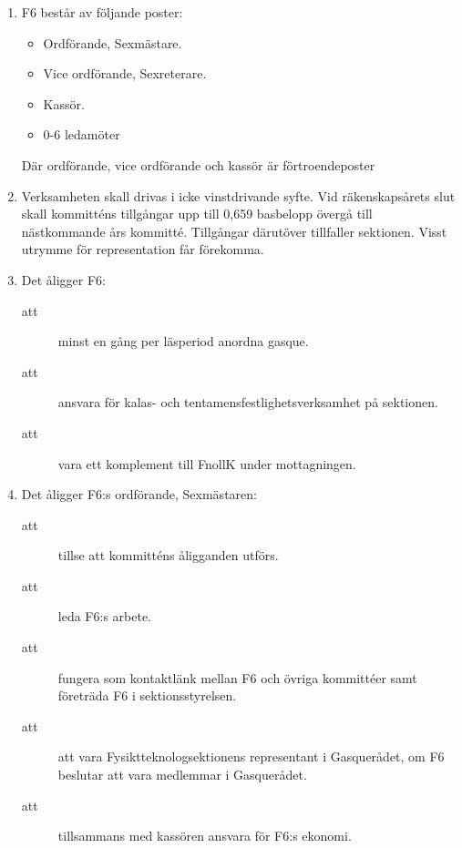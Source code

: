 \documentclass[11pt,a4paper]{article}
\begin{document}
\begin{enumerate}[\thesubsection .1]

  \item F6 består av följande poster:
  
    \begin{itemize}
      \item Ordförande, Sexmästare.
      \item Vice ordförande, Sexreterare.
      \item Kassör.
      \item 0-6 ledamöter
    \end{itemize}
Där ordförande, vice ordförande och kassör är förtroendeposter



  \item Verksamheten skall drivas i icke vinstdrivande syfte. Vid
  räkenskaps\-år\-ets slut skall kommitténs tillgångar upp till 0,659
  basbelopp övergå till nästkommande års kommitté. Tillgångar
  därutöver tillfaller sektionen. Visst utrymme för representation får
  förekomma.

  \item Det åligger F6:
    \begin{description}
      \item[att] minst en gång per läsperiod anordna gasque.
      \item[att] ansvara för kalas- och tentamensfestlighetsverksamhet på sektionen.
      \item[att] vara ett komplement till FnollK under mottagningen.
 
    \end{description}

  \item Det åligger F6:s ordförande, Sexmästaren:
    \begin{description}
      \item[att] tillse att kommitténs åligganden utförs.
      \item[att] leda F6:s arbete.
      \item[att] fungera som kontaktlänk mellan F6 och övriga kommittéer samt företräda F6 i sektionsstyrelsen.
      \item[att] att vara Fysiktteknologsektionens representant i
        Gasquerådet, om F6 beslutar att vara medlemmar i
        Gasquerådet.
      \item[att] tillsammans med kassören ansvara för F6:s ekonomi.
    \end{description}


\end{enumerate}
\end{document}
